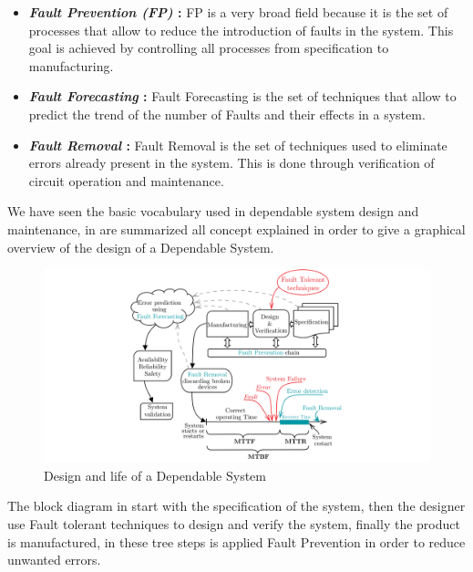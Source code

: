 {{{{\begin{itemize}
					When a fault is detected in a FT system, you can decide to correct it and continue with the execution, or you can disable the system part from which the fault started, in the case of permanent fault. This mode of performances decay of a system is called Graceful Degradation. 
					
					\item \textbf{\textit{Fault Prevention (FP)} : } FP is a very broad field because it is the set of processes that allow to reduce the introduction of faults in the system. This goal is achieved by controlling all processes from specification to manufacturing.
					
					\item \textbf{\textit{Fault Forecasting} : } Fault Forecasting is the set of techniques that allow to predict the trend of the number of Faults and their effects in a system.
					
					\item \textbf{\textit{Fault Removal} : } Fault Removal is the set of techniques used to eliminate errors already present in the system. This is done through verification of circuit operation and maintenance.
				\end{itemize}     	
			} %
			
			We have seen the basic vocabulary used in dependable system design and maintenance, in  are summarized all concept explained in order to give a graphical overview of the design of a Dependable System.  
			\begin{figure}[H]
				\centering
				\includegraphics[scale=0.26,center]{./images/Dependability1.png}
				\caption{Design and life of a Dependable System}
				\label{fig:dependability1}
			\end{figure} 
			The block diagram in  start with the specification of the system, then the designer use Fault tolerant techniques to design and verify the system, finally the product is manufactured, in these tree steps is applied Fault Prevention in order to reduce unwanted errors. 
			
}}}
